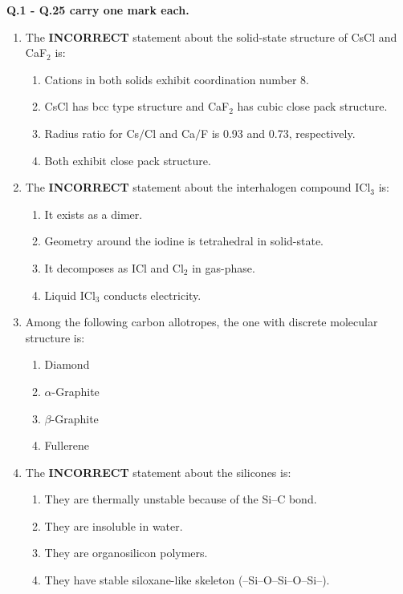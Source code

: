 \documentclass[12pt]{article}
\begin{document}
\newpage
{}
\setcounter{page}{1}
\noindent\textbf{Q.1 - Q.25 carry one mark each.}
\begin{enumerate}[label=Q.\arabic*]

\item The \textbf{INCORRECT} statement about the solid-state structure of CsCl and CaF$_2$ is:

\begin{enumerate}[label=(\Alph*)]
\item Cations in both solids exhibit coordination number 8.
\item CsCl has bcc type structure and CaF$_2$ has cubic close pack structure.
\item Radius ratio for Cs$/$Cl and Ca$/$F is 0.93 and 0.73, respectively.
\item Both exhibit close pack structure.
\end{enumerate}

\item The \textbf{INCORRECT} statement about the interhalogen compound ICl$_3$ is:

\begin{enumerate}[label=(\Alph*)]
\item It exists as a dimer.
\item Geometry around the iodine is tetrahedral in solid-state.
\item It decomposes as ICl and Cl$_2$ in gas-phase.
\item Liquid ICl$_3$ conducts electricity.
\end{enumerate}

\item Among the following carbon allotropes, the one with discrete molecular structure is:

\begin{enumerate}[label=(\Alph*)]
\item Diamond
\item $\alpha$-Graphite
\item $\beta$-Graphite
\item Fullerene
\end{enumerate}

\item The \textbf{INCORRECT} statement about the silicones is:

\begin{enumerate}[label=(\Alph*)]
\item They are thermally unstable because of the Si–C bond.
\item They are insoluble in water.
\item They are organosilicon polymers.
\item They have stable siloxane-like skeleton (–Si–O–Si–O–Si–).
\end{enumerate}


\end{enumerate}
\end{document}
